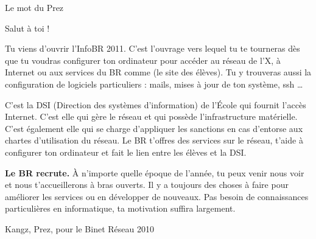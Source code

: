 

\begin{center}
    { \Huge Le mot du Prez }
\end{center}

Salut \`a toi !

Tu viens d'ouvrir l'InfoBR 2011. C'est l'ouvrage vers lequel tu te tourneras d\`es que tu voudras configurer ton ordinateur pour acc\'eder au r\'eseau de l'X, \`a Internet ou aux services du BR comme \fkz (le site des \'el\`eves). Tu y trouveras aussi la configuration de logiciels particuliers : mails, mises \`a jour de ton syst\`eme, ssh \dots
{}

C'est la DSI (Direction des syst\`emes d'information) de l'\'Ecole qui fournit l'acc\`es Internet. C'est elle qui g\`ere
le r\'eseau et qui poss\`ede l'infrastructure mat\'erielle.
C'est \'egalement elle qui se charge d'appliquer les sanctions en cas d'entorse aux chartes d'utilisation du r\'eseau. Le BR t'offres des services sur le r\'eseau, t'aide \`a configurer ton ordinateur et fait le lien entre les \'el\`eves et la DSI.

\textbf{Le BR recrute.} \`A n'importe quelle \'epoque de l'ann\'ee, tu peux venir nous voir et nous t'accueillerons \`a bras ouverts. Il y a toujours des choses \`a faire pour am\'eliorer les services ou en d\'evelopper de nouveaux. Pas besoin de connaissances particuli\`eres en informatique, ta motivation suffira largement.

\begin{flushright}
    Kangz, Prez, pour le Binet R\'eseau 2010
\end{flushright}

